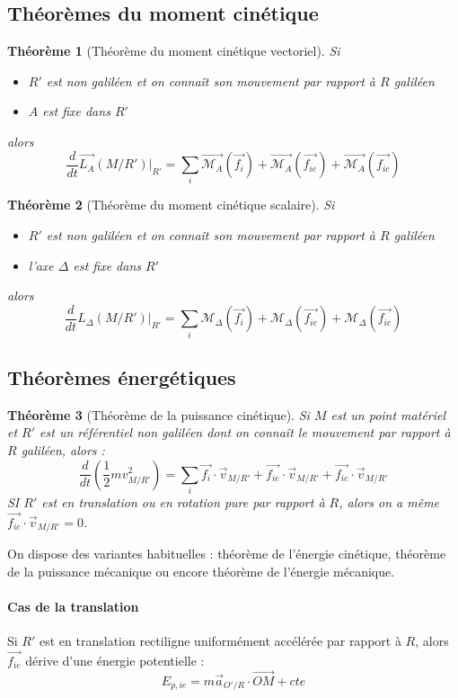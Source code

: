 \documentclass[french]{book}
\theoremstyle{plain}
\newtheorem{thm}{Théorème}
\theoremstyle{definition}
\theoremstyle{remark}
\begin{document}
\subsection{Théorèmes du moment cinétique}
\begin{thm}[Théorème du moment cinétique vectoriel]
	Si \begin{itemize}
		\item $R'$ est non galiléen et on connaît son mouvement par rapport à $R$ galiléen
		\item $A$ est fixe dans $R'$
	\end{itemize}
	alors $$\frac{d}{dt}\overrightarrow{L_A}(M/R')\bigg\rvert_{R'}=\sum_i\overrightarrow{\mathcal{M}_A}\left(\overrightarrow{f_i}\right)+\overrightarrow{\mathcal{M}_A}\left(\overrightarrow{f_{ie}}\right)+\overrightarrow{\mathcal{M}_A}\left(\overrightarrow{f_{ic}}\right)$$
\end{thm}
\begin{thm}[Théorème du moment cinétique scalaire]
	Si \begin{itemize}
		\item $R'$ est non galiléen et on connaît son mouvement par rapport à $R$ galiléen
		\item l'axe $\Delta$ est fixe dans $R'$
	\end{itemize}
	alors $$\frac{d}{dt}L_\Delta(M/R')\bigg\rvert_{R'}=\sum_i\mathcal{M}_\Delta\left(\overrightarrow{f_i}\right)+\mathcal{M}_\Delta\left(\overrightarrow{f_{ie}}\right)+\mathcal{M}_\Delta\left(\overrightarrow{f_{ic}}\right)$$
\end{thm}
\subsection{Théorèmes énergétiques}
\begin{thm}[Théorème de la puissance cinétique]
	Si $M$ est un point matériel et $R'$ est un référentiel non galiléen dont on connaît le mouvement par rapport à $R$ galiléen, alors : $$\frac{d}{dt}\left(\frac{1}{2}mv_{M/R'}^2\right)=\sum_i\overrightarrow{f_i}\cdot\overrightarrow{v}_{M/R'}+\overrightarrow{f_{ie}}\cdot\overrightarrow{v}_{M/R'}+\overrightarrow{f_{ic}}\cdot\overrightarrow{v}_{M/R'}$$ SI $R'$ est en translation ou en rotation pure par rapport à $R$, alors on a même $\overrightarrow{f_{ic}}\cdot\overrightarrow{v}_{M/R'}=0$.
\end{thm}
On dispose des variantes habituelles : théorème de l'énergie cinétique, théorème de la puissance mécanique ou encore théorème de l'énergie mécanique.
\paragraph{Cas de la translation}
Si $R'$ est en translation rectiligne uniformément accélérée par rapport à $R$, alors $\overrightarrow{f_{ie}}$ dérive d'une énergie potentielle : $$E_{p,ie}=m\overrightarrow{a}_{O'/R}\cdot\overrightarrow{OM}+cte$$
\end{document}
